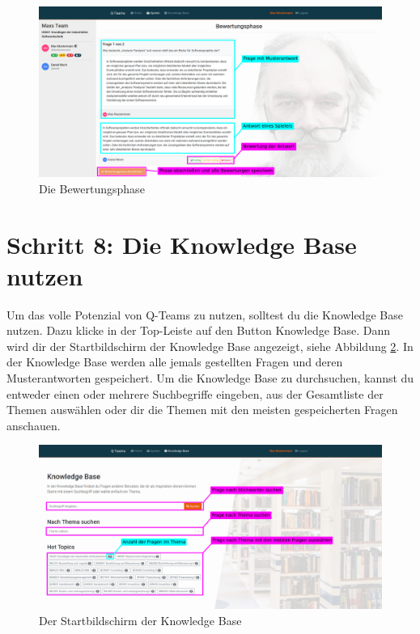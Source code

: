 \documentclass[a4paper,11pt,listof=numbered,glossary=totoc,parskip=half,toc=bib]{scrreprt}
\begin{document}
\begin{appendices}
	\begin{figure}[h!]
		\centering
		\includegraphics[width=\textwidth]{UserGuide/Bewertungsphase.png}
		\caption{Die Bewertungsphase}
		\label{fig:guide_bewertungsphase}
	\end{figure}
	
	\newpage
	\section*{Schritt 8: Die Knowledge Base nutzen}
						
	Um das volle Potenzial von Q-Teams zu nutzen, solltest du die Knowledge Base nutzen. Dazu klicke in der Top-Leiste auf den Button Knowledge Base. Dann wird dir der Startbildschirm der Knowledge Base angezeigt, siehe Abbildung \ref{fig:guide_kb_start}. In der Knowledge Base werden alle jemals gestellten Fragen und deren Musterantworten gespeichert. Um die Knowledge Base zu durchsuchen, kannst du entweder einen oder mehrere Suchbegriffe eingeben, aus der Gesamtliste der Themen auswählen oder dir die Themen mit den meisten gespeicherten Fragen anschauen.				
						
	\begin{figure}[h!]
		\centering
		\includegraphics[width=\textwidth]{UserGuide/Knowledge_Base_start.png}
		\caption{Der Startbildschirm der Knowledge Base}
		\label{fig:guide_kb_start}
	\end{figure}	
	

\end{appendices}
\end{document}
